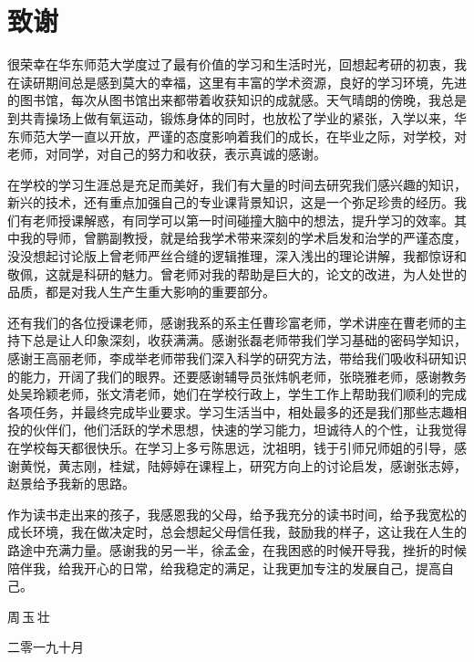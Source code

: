 {\kaishu
\chapter*{致\qquad 谢}
很荣幸在华东师范大学度过了最有价值的学习和生活时光，回想起考研的初衷，我在读研期间总是感到莫大的幸福，这里有丰富的学术资源，良好的学习环境，先进的图书馆，每次从图书馆出来都带着收获知识的成就感。天气晴朗的傍晚，我总是到共青操场上做有氧运动，锻炼身体的同时，也放松了学业的紧张，入学以来，华东师范大学一直以开放，严谨的态度影响着我们的成长，在毕业之际，对学校，对老师，对同学，对自己的努力和收获，表示真诚的感谢。

在学校的学习生涯总是充足而美好，我们有大量的时间去研究我们感兴趣的知识，新兴的技术，还有重点加强自己的专业课背景知识，这是一个弥足珍贵的经历。我们有老师授课解惑，有同学可以第一时间碰撞大脑中的想法，提升学习的效率。其中我的导师，曾鹏副教授，就是给我学术带来深刻的学术启发和治学的严谨态度，没没想起讨论版上曾老师严丝合缝的逻辑推理，深入浅出的理论讲解，我都惊讶和敬佩，这就是科研的魅力。曾老师对我的帮助是巨大的，论文的改进，为人处世的品质，都是对我人生产生重大影响的重要部分。

还有我们的各位授课老师，感谢我系的系主任曹珍富老师，学术讲座在曹老师的主持下总是让人印象深刻，收获满满。感谢张磊老师带我们学习基础的密码学知识，感谢王高丽老师，李成举老师带我们深入科学的研究方法，带给我们吸收科研知识的能力，开阔了我们的眼界。还要感谢辅导员张炜帆老师，张晓雅老师，感谢教务处吴玲颖老师，张文清老师，她们在学校行政上，学生工作上帮助我们顺利的完成各项任务，并最终完成毕业要求。学习生活当中，相处最多的还是我们那些志趣相投的伙伴们，他们活跃的学术思想，快速的学习能力，坦诚待人的个性，让我觉得在学校每天都很快乐。在学习上多亏陈思远，沈祖明，钱于引师兄师姐的引导，感谢黄悦，黄志刚，桂斌，陆婷婷在课程上，研究方向上的讨论启发，感谢张志婷，赵景给予我新的思路。

作为读书走出来的孩子，我感恩我的父母，给予我充分的读书时间，给予我宽松的成长环境，我在做决定时，总会想起父母信任我，鼓励我的样子，这让我在人生的路途中充满力量。感谢我的另一半，徐孟金，在我困惑的时候开导我，挫折的时候陪伴我，给我开心的日常，给我稳定的满足，让我更加专注的发展自己，提高自己。

\vspace{0.8cm} \hspace{9.8cm}  周\,玉\,壮

\hspace{9cm}  二零一九十月 }
